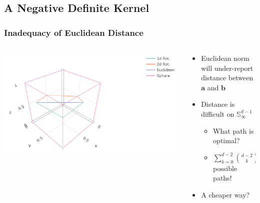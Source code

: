 \documentclass[aspectratio=169]{beamer}
\begin{document}
\subsection{A Negative Definite Kernel}

\begin{frame}
    \frametitle{Inadequacy of Euclidean Distance}
    \begin{columns}[T] %
    \begin{column}{.60\textwidth}
    \centering
    \includegraphics[width=\linewidth]{./images/rotation}
    \end{column}%
    \hfill
    \begin{column}{0.4\textwidth}
    \begin{itemize}
      \item Euclidean norm will under-report distance between $\bm{a}$ and $\bm{b}$
      \pause
      \item Distance is difficult on ${\mathbb S}_{\infty}^{d-1}$
        \begin{itemize}
          \item What path is optimal?
          \item $\sum_{k = 0}^{d-2}\binom{d-2}{k}$ possible paths!
        \end{itemize}
      \item A cheaper way?
    \end{itemize}
    \end{column}
    \end{columns}
\end{frame}
\end{document}
